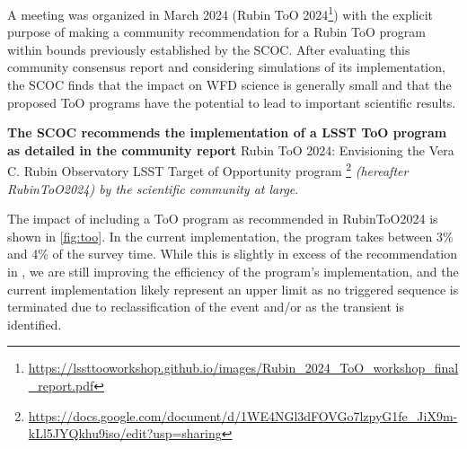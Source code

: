 A meeting was organized in March 2024 (Rubin ToO 2024\footnote{\url{https://lssttooworkshop.github.io/images/Rubin_2024_ToO_workshop_final_report.pdf}}) with the explicit purpose of making a community recommendation for a Rubin ToO program within bounds previously established by the SCOC. After evaluating this community consensus report and considering simulations of its implementation, the SCOC finds that the impact on WFD science is generally small and that the proposed ToO programs have the potential to lead to important scientific results. 

 {\bf The SCOC recommends the implementation of a LSST ToO program as detailed in the community report} Rubin ToO 2024: 
Envisioning the Vera C. Rubin Observatory LSST Target of Opportunity program
\footnote{\url{https://docs.google.com/document/d/1WE4NGl3dFOVGo7lzpyG1fe_JiX9m-kLl5JYQkhu9iso/edit?usp=sharing}} \emph{(hereafter RubinToO2024) by the scientific community at large}. 


The impact of including a ToO program as recommended in RubinToO2024 is shown in \autoref{fig:too}. In the current implementation, the program takes between 3\% and 4\% of the survey time. While this is slightly in excess of the recommendation in , we are still improving the efficiency of the program's implementation, and the current implementation likely represent an upper limit as no triggered sequence is terminated due to reclassification of the event and/or as the transient is identified.

